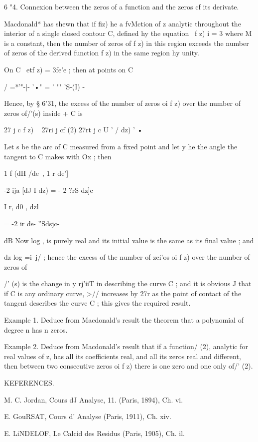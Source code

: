 {6 "4. Connexion between the zeros of a function and the zeros cf its
derivate.

Macdonald* has shewn that if fiz) he a fvMction of z analytic
throughout the interior of a single closed contour C, defined hy the
equation \ f z) i = 3 where M is a constant, then the number of zeros
of f z) in this region exceeds the number of zeros of the derived
function f z) in the same region hy unity.

On C \ etf z) = 3fe'e ; then at points on C

/ =*'"-|- '•" = ' "" 'S-(I) -

Hence, by § 6'31, the excess of the number of zeros oi f z) over the
number of zeros of/'(s) inside + C is

27 j c f z) ~ 27ri j cf (2) 27rt j c U ' / dz) ' •

Let s be the arc of C measured from a fixed point and let y he the
angle the tangent to C makes with Ox ; then

1 f (dH /de\ , 1 r de']

-2 ija [dJ I dz) = - 2 ?rS dz]c

I r, d0 , dzl

= -2 ir ds- ''Sdsjc-

dB Now log , is purely real and its initial value is the same as its
final value ; and

dz log =i\ j/ ; hence the excess of the number of zei'os oi f z) over
the number of zeros of

/' (s) is the change in y rj'iiT in describing the curve C ; and it is
obvious J that if C is any ordinary curve, >// increases by 27r as the
point of contact of the tangent describes the curve C ; this gives the
required result.

Example 1. Deduce from Macdonald's result the theorem that a
polynomial of degree n has n zeros.

Example 2. Deduce from Macdonald's result that if a function/ (2),
analytic for real values of z, has all its coefficients real, and all
its zeros real and different, then between two consecutive zeros oi f
z) there is one zero and one only of/' (2).



KEFERENCES.

M. C. Jordan, Cours dJ Analyse, 11. (Paris, 1894), Ch. vi.

E. GouRSAT, Cours d' Analyse (Paris, 1911), Ch. xiv.

E. LiNDELOF, Le Calcid des Residus (Paris, 1905), Ch. il.

}
